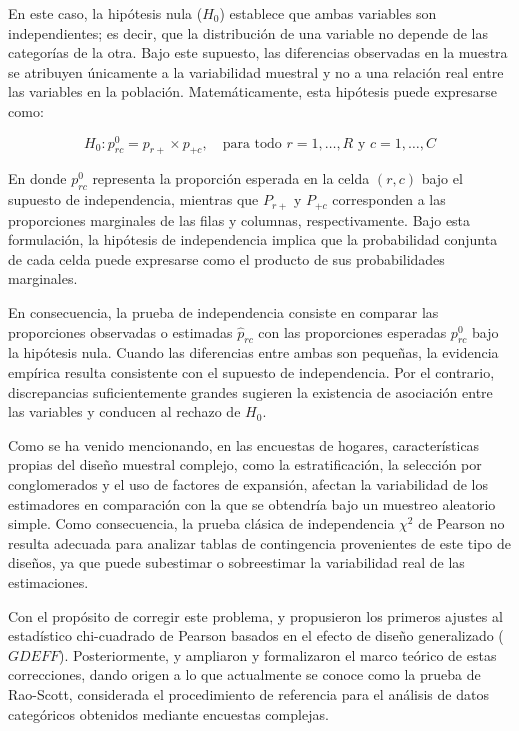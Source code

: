 \documentclass[
  spanish,
  12pt,
]{book}
\begin{document}
En este caso, la hipótesis nula (\(H_{0}\)) establece que ambas variables son independientes; es decir, que la distribución de una variable no depende de las categorías de la otra. Bajo este supuesto, las diferencias observadas en la muestra se atribuyen únicamente a la variabilidad muestral y no a una relación real entre las variables en la población. Matemáticamente, esta hipótesis puede expresarse como:

\[
H_0: p_{rc}^0 = p_{r+} \times p_{+c}, \quad \text{para todo } r = 1,\ldots,R \text{ y } c = 1,\ldots,C
\]

En donde \(p_{rc}^0\) representa la proporción esperada en la celda \((r,c)\) bajo el supuesto de independencia, mientras que \(P_{r+}\) y \(P_{+c}\) corresponden a las proporciones marginales de las filas y columnas, respectivamente. Bajo esta formulación, la hipótesis de independencia implica que la probabilidad conjunta de cada celda puede expresarse como el producto de sus probabilidades marginales.

En consecuencia, la prueba de independencia consiste en comparar las proporciones observadas o estimadas \(\hat{p}_{rc}\) con las proporciones esperadas \(p_{rc}^0\) bajo la hipótesis nula. Cuando las diferencias entre ambas son pequeñas, la evidencia empírica resulta consistente con el supuesto de independencia. Por el contrario, discrepancias suficientemente grandes sugieren la existencia de asociación entre las variables y conducen al rechazo de \(H_0\).

Como se ha venido mencionando, en las encuestas de hogares, características propias del diseño muestral complejo, como la estratificación, la selección por conglomerados y el uso de factores de expansión, afectan la variabilidad de los estimadores en comparación con la que se obtendría bajo un muestreo aleatorio simple. Como consecuencia, la prueba clásica de independencia \(\chi^2\) de Pearson no resulta adecuada para analizar tablas de contingencia provenientes de este tipo de diseños, ya que puede subestimar o sobreestimar la variabilidad real de las estimaciones.

Con el propósito de corregir este problema, \citet{fay1979contingency} y \citet{fellegi1980approximate} propusieron los primeros ajustes al estadístico chi-cuadrado de Pearson basados en el efecto de diseño generalizado (\(GDEFF\)). Posteriormente, \citet{rao1984chisquare} y \citet{thomas1987chisquare} ampliaron y formalizaron el marco teórico de estas correcciones, dando origen a lo que actualmente se conoce como la prueba de Rao-Scott, considerada el procedimiento de referencia para el análisis de datos categóricos obtenidos mediante encuestas complejas.
\end{document}
